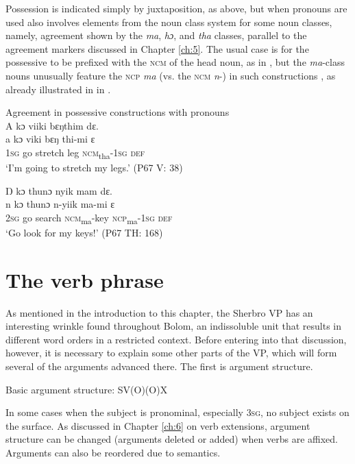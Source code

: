 Possession is indicated simply by juxtaposition, as above, but when pronouns are used also involves elements from the noun class system for some noun classes, namely, agreement shown by the \textit{ma}, \textit{hɔ}, and \textit{tha} classes, parallel to the agreement markers discussed in Chapter \ref{ch:5}. The usual case is for the possessive to be prefixed with the \textsc{ncm} of the head noun, as in , but the \textit{ma}{}-class nouns unusually feature the \textsc{ncp} \textit{ma} (vs. the \textsc{ncm} \textit{n}{}-) in such constructions , as already illustrated in  in .

\ea%
    \label{ex:196}
    Agreement in possessive constructions with pronouns\\
    \ea \label{ex:196a}  A kɔ viiki bɛŋthim   dɛ.\\
    \gll a    kɔ    viki    bɛŋ  thi-mi      ɛ\\
    \textsc{1sg}  go    stretch  leg  \textsc{ncm}\textsubscript{tha}{}-\textsc{1sg}    \textsc{def}\\
    \glt ‘I'm going to stretch my legs.' (P67 V: 38)

    \ex \label{ex:196b}  Ŋ kɔ thunɔ nyik mam dɛ.\\
    \gll n    kɔ    thunɔ    n-yiik      ma-mi    ɛ\\
    \textsc{2sg}  go    search  \textsc{ncm}\textsubscript{ma}{}-key  \textsc{ncp}\textsubscript{ma}{}-\textsc{1sg}  \textsc{def}\\
    \glt ‘Go look for my keys!' (P67 TH: 168)
\z
\z

\section{The verb phrase}
\label{sec:8.2}\hypertarget{Toc115517814}{}
As mentioned in the introduction to this chapter, the Sherbro \textsc{VP} has an interesting wrinkle found throughout Bolom, an indissoluble unit that results in different word orders in a restricted context. Before entering into that discussion, however, it is necessary to explain some other parts of the VP, which will form several of the arguments advanced there. The first is argument structure.

\ea%
    \label{ex:197}
    Basic argument structure: SV(O)(O)X\\
\z

In some cases when the subject is pronominal, especially \textsc{3sg}, no subject exists on the surface. As discussed in Chapter \ref{ch:6} on verb extensions, argument structure can be changed (arguments deleted or added) when verbs are affixed. Arguments can also be reordered due to semantics.

